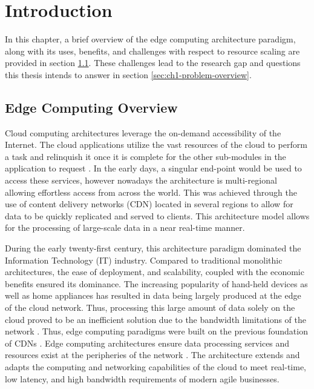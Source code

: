 \clearpage

\def\chaptertitle{Introduction}

\lhead{\emph{\chaptertitle}}

\chapter{\chaptertitle}
\label{ch:introduction}

In this chapter, a brief overview of the edge computing architecture paradigm, along with its uses, benefits, and challenges with respect to resource scaling are provided in section \ref{sec:ch1-edge-arch}. These challenges lead to the research gap and questions this thesis intends to answer in section \ref{sec:ch1-problem-overview}.\par

\section{Edge Computing Overview}
\label{sec:ch1-edge-arch}

Cloud computing architectures leverage the on-demand accessibility of the Internet. The cloud applications utilize the vast resources of the cloud to perform a task and relinquish it once it is complete for the other sub-modules in the application to request \cite{rimal2009taxonomy}. In the early days, a singular end-point would be used to access these services, however nowadays the architecture is multi-regional allowing effortless access from across the world. This was achieved through the use of content delivery networks (CDN) located in several regions to allow for data to be quickly replicated and served to clients. This architecture model allows for the processing of large-scale data in a near real-time manner.\par

During the early twenty-first century, this architecture paradigm dominated the Information Technology (IT) industry. Compared to traditional monolithic architectures, the ease of deployment, and scalability, coupled with the economic benefits ensured its dominance. The increasing popularity of hand-held devices as well as home appliances has resulted in data being largely produced at the edge of the cloud network. Thus, processing this large amount of data solely on the cloud proved to be an inefficient solution due to the bandwidth limitations of the network \cite{shi2016edge}. Thus, edge computing paradigms were built on the previous foundation of CDNs \cite{satyanarayanan2017emergence}. Edge computing architectures ensure data processing services and resources exist at the peripheries of the network \cite{cao2020overview}. The architecture extends and adapts the computing and networking capabilities of the cloud to meet real-time, low latency, and high bandwidth requirements of modern agile businesses.\par

